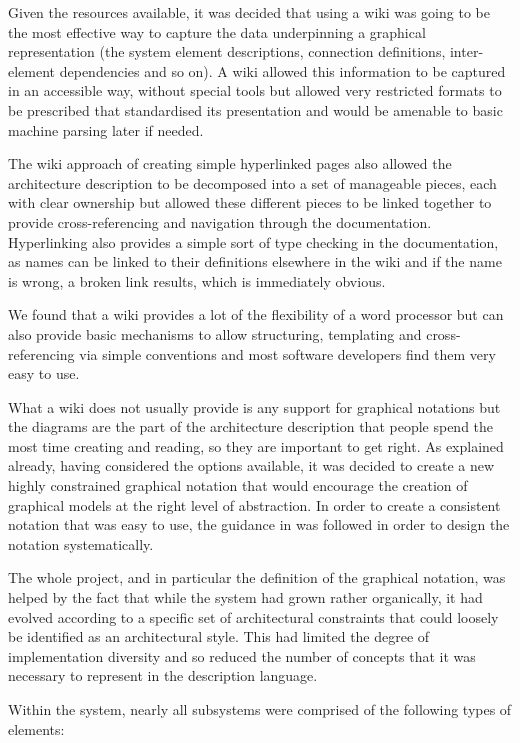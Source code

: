   Given the resources available, it was decided that using a wiki was going to be the most effective way to capture the data underpinning a graphical representation (the system element descriptions, connection definitions, inter-element dependencies and so on).  A wiki allowed this information to be captured in an accessible way, without special tools but allowed very restricted formats to be prescribed that standardised its presentation and would be amenable to basic machine parsing later if needed.

  The wiki approach of creating simple hyperlinked pages also allowed the architecture description to be decomposed into a set of manageable pieces, each with clear ownership but allowed these different pieces to be linked together to provide cross-referencing and navigation through the documentation.  Hyperlinking also provides a simple sort of type checking in the documentation, as names can be linked to their definitions elsewhere in the wiki and if the name is wrong, a broken link results, which is immediately obvious.

  We found that a wiki provides a lot of the flexibility of a word processor but can also provide basic mechanisms to allow structuring, templating and cross-referencing via simple conventions and most software developers find them very easy to use.

  What a wiki does not usually provide is any support for graphical notations but the diagrams are the part of the architecture description that people spend the most time creating and reading, so they are important to get right.  As explained already, having considered the options available, it was decided to create a new highly constrained graphical notation that would encourage the creation of graphical models at the right level of abstraction.  In order to create a consistent notation that was easy to use, the guidance in \cite{moody2009-notations} was followed in order to design the notation systematically.

  The whole project, and in particular the definition of the graphical notation, was helped by the fact that while the system had grown rather organically, it had evolved according to a specific set of architectural constraints that could loosely be identified as an architectural style.  This had limited the degree of implementation diversity and so reduced the number of concepts that it was necessary to represent in the description language.

  Within the system, nearly all subsystems were comprised of the following types of elements:

